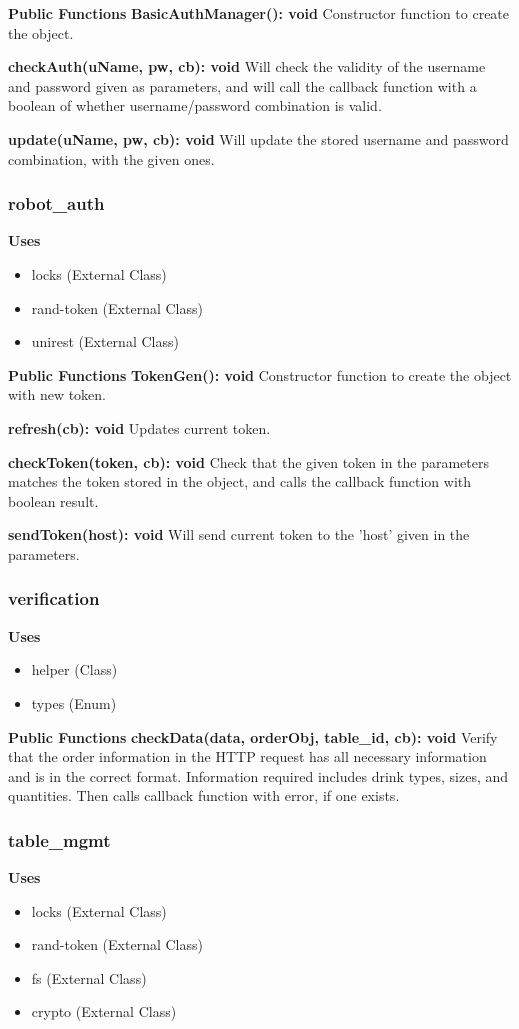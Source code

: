 \documentclass [10pt]{article}
\begin{document}
\textbf{Public Functions}
\textbf{BasicAuthManager(): void}
Constructor function to create the object.

\textbf{checkAuth(uName, pw, cb): void}
Will check the validity of the username and password given as parameters, and will call the callback function with a boolean of whether username/password combination is valid.

\textbf{update(uName, pw, cb): void}
Will update the stored username and password combination, with the given ones.

\subsubsection{robot\_auth}
\textbf{Uses}
\begin{itemize}
	\item locks (External Class)
	\item rand-token (External Class)
	\item unirest (External Class)
\end{itemize}

\textbf{Public Functions}
\textbf{TokenGen(): void}
Constructor function to create the object with new token.

\textbf{refresh(cb): void}
Updates current token.

\textbf{checkToken(token, cb): void}
Check that the given token in the parameters matches the token stored in the object, and calls the callback function with boolean result.

\textbf{sendToken(host): void}
Will send current token to the 'host' given in the parameters.

\subsubsection{verification}
\textbf{Uses}
\begin{itemize}
	\item helper (Class)
	\item types (Enum)
\end{itemize}

\textbf{Public Functions}
\textbf{checkData(data, orderObj, table\_id, cb): void}
Verify that the order information in the HTTP request has all necessary information and is in the correct format. Information required includes drink types, sizes, and quantities. Then calls callback function with error, if one exists.

\subsubsection{table\_mgmt}
\textbf{Uses}
\begin{itemize}
	\item locks (External Class)
	\item rand-token (External Class)
	\item fs (External Class)
	\item crypto (External Class)
\end{itemize}
\end{document}
